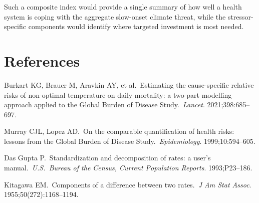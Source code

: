 \documentclass[11pt,a4paper]{article}
\begin{document}
Such a composite index would provide a single summary of how well a health system is coping with the aggregate slow-onset climate threat, while the stressor-specific components would identify where targeted investment is most needed.

\section*{References}

\begin{enumerate}[nosep, label={[\arabic*]}]
  \item Burkart KG, Brauer M, Aravkin AY, et al.\ Estimating the cause-specific relative risks of non-optimal temperature on daily mortality: a two-part modelling approach applied to the Global Burden of Disease Study.\ \textit{Lancet}. 2021;398:685--697.
  \item Murray CJL, Lopez AD.\ On the comparable quantification of health risks: lessons from the Global Burden of Disease Study.\ \textit{Epidemiology}. 1999;10:594--605.
  \item Das Gupta P.\ Standardization and decomposition of rates: a user's manual.\ \textit{U.S.\ Bureau of the Census, Current Population Reports}. 1993;P23--186.
  \item Kitagawa EM.\ Components of a difference between two rates.\ \textit{J Am Stat Assoc}. 1955;50(272):1168--1194.
\end{enumerate}
\end{document}
